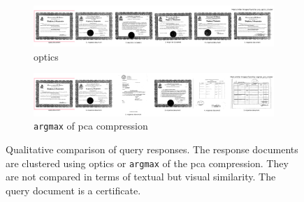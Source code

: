\begin{figure}[h!]
    \begin{subfigure}{\textwidth}
        \centering
        \includegraphics[width=1\textwidth]{images/query_results/320a70609babe5923c860ad16bc9f48e237b9d275c5269d177befab542bcff50/Most_similar_images_found_by_pca_optics_cluster.pdf}
        \caption{\ac{optics}}
        \label{fig:bad_query_resp_tfidf}
    \end{subfigure}

    \begin{subfigure}{\textwidth}
        \centering
        \includegraphics[width=1\textwidth]{images/query_results/320a70609babe5923c860ad16bc9f48e237b9d275c5269d177befab542bcff50/Most_similar_images_found_by_argmax_pca_cluster.pdf}
        \caption{\texttt{argmax} of \ac{pca} compression}
        \label{fig:good_query_resp_sbert}
    \end{subfigure}

\caption[Qualitative comparison of query responses]{Qualitative comparison of query responses.
The response documents are clustered using \ac{optics} or \texttt{argmax} of the \ac{pca} compression.
They are not compared in terms of textual but visual similarity.
The query document is a certificate.
}
\label{fig:comp_vis_query_resp_certificates}
\end{figure}